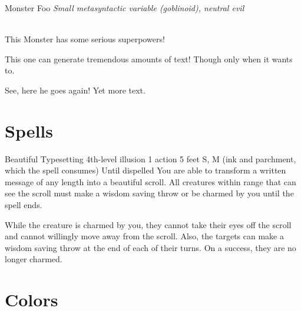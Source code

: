 \documentclass[10pt,twoside,twocolumn,openany]{book}
\begin{document}
\begin{monsterbox}{Monster Foo}
	\textit{Small metasyntactic variable (goblinoid), neutral evil}\\
	\hline
	\basics[%
	armorclass = 12,
	hitpoints  = \dice{3d8 + 3},
	speed      = 50 ft
	]
	\hline
	\stats[
    STR = \stat{12}, %
    DEX = \stat{7}
	]
	\hline
	\details[%
	languages = {Common Lisp, Erlang},
	]
	\hline \\[1mm]
	\begin{monsteraction}
		This Monster has some serious superpowers!
	\end{monsteraction}
	\begin{monsteraction}
		This one can generate tremendous amounts of text! Though only when it wants to.
	\end{monsteraction}

	\begin{monsteraction}
    See, here he goes again! Yet more text.
	\end{monsteraction}
\end{monsterbox}

\section{Spells}

\begin{spell}
	{Beautiful Typesetting}
	{4th-level illusion}
	{1 action}
	{5 feet}
	{S, M (ink and parchment, which the spell consumes)}
	{Until dispelled}
	You are able to transform a written message of any length into a beautiful scroll. All creatures within range that can see the scroll must make a wisdom saving throw or be charmed by you until the spell ends.

	While the creature is charmed by you, they cannot take their eyes off the scroll and cannot willingly move away from the scroll. Also, the targets can make a wisdom saving throw at the end of each of their turns. On a success, they are no longer charmed.
\end{spell}

\lipsum[1-2]

\section{Colors}
\end{document}
